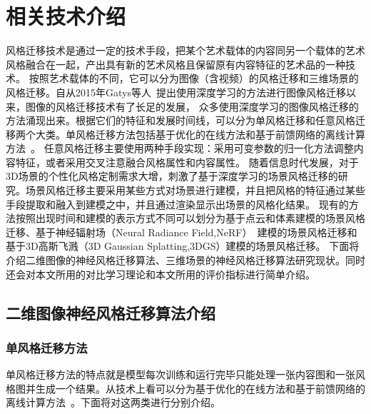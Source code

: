 \chapter{相关技术介绍}
风格迁移技术是通过一定的技术手段，把某个艺术载体的内容同另一个载体的艺术风格融合在一起，产出具有新的艺术风格且保留原有内容特征的艺术品的一种技术。
按照艺术载体的不同，它可以分为图像（含视频）的风格迁移和三维场景的风格迁移。自从2015年Gatys等人~\cite{gatys2016image}提出使用深度学习的方法进行图像风格迁移以来，图像的风格迁移技术有了长足的发展，
众多使用深度学习的图像风格迁移的方法涌现出来。根据它们的特征和发展时间线，可以分为单风格迁移和任意风格迁移两个大类。单风格迁移方法包括基于优化的在线方法和基于前馈网络的离线计算方法~\cite{jing2019neural}。
任意风格迁移主要使用两种手段实现：采用可变参数的归一化方法调整内容特征，或者采用交叉注意融合风格属性和内容属性。
随着信息时代发展，对于3D场景的个性化风格定制需求大增，刺激了基于深度学习的场景风格迁移的研究。场景风格迁移主要采用某些方式对场景进行建模，并且把风格的特征通过某些手段提取和融入到建模之中，并且通过渲染显示出场景的风格化结果。
现有的方法按照出现时间和建模的表示方式不同可以划分为基于点云和体素建模的场景风格迁移、基于神经辐射场（Neural Radiance Field,NeRF）~\cite{mildenhall2021nerf}建模的场景风格迁移和基于3D高斯飞溅（3D Gaussian Splatting,3DGS）建模的场景风格迁移。
下面将介绍二维图像的神经风格迁移算法、三维场景的神经风格迁移算法研究现状。同时还会对本文所用的对比学习理论和本文所用的评价指标进行简单介绍。
\section{二维图像神经风格迁移算法介绍}
\subsection{单风格迁移方法}
单风格迁移方法的特点就是模型每次训练和运行完毕只能处理一张内容图和一张风格图并生成一个结果。从技术上看可以分为基于优化的在线方法和基于前馈网络的离线计算方法~\cite{jing2019neural}。下面将对这两类进行分别介绍。

